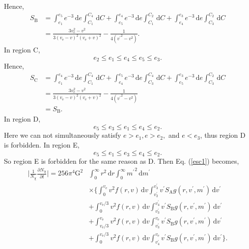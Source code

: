 \documentclass[aps,floatfix,prd,showpacs]{revtex4}
\newcommand{\diff}{\mathrm{d}}
\newcommand{\vesc}{v_{\text{e}}}
\newcommand{\vp}{v^\prime}
\newcommand{\mpr}{m^\prime}
\newcommand{\SA}{S_{\text{A}}}
\newcommand{\SB}{S_{\text{B}}}
\newcommand{\SC}{S_{\text{C}}}
\newcommand{\G}{\text{G}}
\newcommand{\Nx}{N_\chi}
\begin{document}
%
%
Hence,
%
\begin{equation}
\begin{split}
\SB & = \int^{e_5}_{e_1}{e^{-3}}\,\diff e\int^{C_4}_{C_1}\,\diff C + \int^{e_4}_{e_5}{e^{-3}}\,\diff e\int^{C_2}_{C_1}\,\diff C + \int^{e_3}_{e_4}{e^{-3}}\,\diff e\int^{C_2}_{C_3}\,\diff C \\
& = \frac{3\vesc^2 - v^2}{3(\vesc - v)^2(\vesc+v)^2} - \frac{1}{4({\vp}^2 - v^2)}.
\end{split}
\end{equation}
%
%
In region C,
%
\begin{equation}
e_2 \le e_1 \le e_4 \le e_5 \le e_3.
\end{equation}
%
%
Hence,
%
\begin{equation}
\begin{split}
\SC & = \int^{e_4}_{e_1}{e^{-3}}\,\diff e\int^{C_4}_{C_1}\,\diff C + \int^{e_5}_{e_4}{e^{-3}}\,\diff e\int^{C_4}_{C_3}\,\diff C + \int^{e_3}_{e_5}{e^{-3}}\,\diff e\int^{C_2}_{C_3}\,\diff C \\
& = \frac{3\vesc^2 - v^2}{3(\vesc - v)^2(\vesc+v)^2} - \frac{1}{4({\vp}^2 - v^2)}\\
&= \SB.
\end{split}
\end{equation}
%
%
In region D,
%
\begin{equation}
e_5 \le e_3 \le e_1 \le e_4 \le e_2.
\end{equation}
%
%
Here we can not simultaneously satisfy $e > e_1, e > e_2,$ and $e < e_3$, thus region D is forbidden. In region E,
%
\begin{equation}
e_5 \le e_1 \le e_3 \le e_4 \le e_2.
\end{equation}
%
%
So region E is forbidden for the same reason as D. Then Eq. (\ref{esc1}) becomes,
%
\begin{equation}
\label{esc2}
\begin{split}
\bigg|\frac{1}{\Nx}\frac{\partial \Nx}{\partial t}\bigg| = 256\pi^4\G^2&\int^\infty_0{r^2}\,\diff r\int^\infty_0{\mpr}^2\,\diff \mpr \\ 
& \times \Bigg\{\int^{\vesc}_0{v^2f(r,v)}\,\diff v\int^{\vp_3}_{\vp_2}{\vp \SA g(r,\vp,\mpr)}\,\diff \vp \\
&+ \int^{\vesc/3}_0{v^2f(r,v)}\,\diff v\int^{\vp_4}_{\vp_3}{\vp \SB g(r,\vp,\mpr)}\,\diff \vp \\
& + \int^{\vesc}_{\vesc/3}{v^2f(r,v)}\,\diff v\int^{\vesc}_{\vp_3}{\vp \SB g(r,\vp,\mpr)}\,\diff \vp \\ &+\int^{\vesc/3}_0{v^2f(r,v)}\,\diff v\int^{\vesc}_{\vp_4}{\vp \SB g(r,\vp,\mpr)}\,\diff \vp\Bigg\}.
\end{split}
\end{equation}
\end{document}
